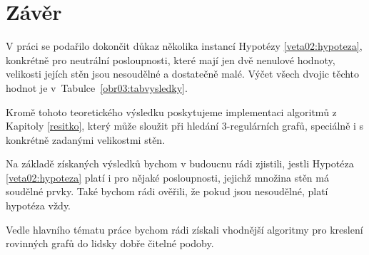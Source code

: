 \chapter*{Závěr}
V práci se podařilo dokončit důkaz několika instancí Hypotézy \ref{veta02:hypoteza}, konkrétně pro neutrální posloupnosti, které mají jen dvě nenulové hodnoty, velikosti jejích stěn jsou nesoudělné a dostatečně malé. Výčet všech dvojic těchto hodnot je v~Tabulce~\ref{obr03:tabvysledky}.

Kromě tohoto teoretického výsledku poskytujeme implementaci algoritmů z Kapitoly \ref{resitko}, který může sloužit při hledání 3-regulárních grafů, speciálně i s konkrétně zadanými velikostmi stěn.

Na základě získaných výsledků bychom v budoucnu rádi zjistili, jestli Hypotéza \ref{veta02:hypoteza} platí i pro nějaké posloupnosti, jejichž množina stěn má soudělné prvky. Také bychom rádi ověřili, že pokud jsou nesoudělné, platí hypotéza vždy.

Vedle hlavního tématu práce bychom rádi získali vhodnější algoritmy pro kreslení rovinných grafů do lidsky dobře čitelné podoby.